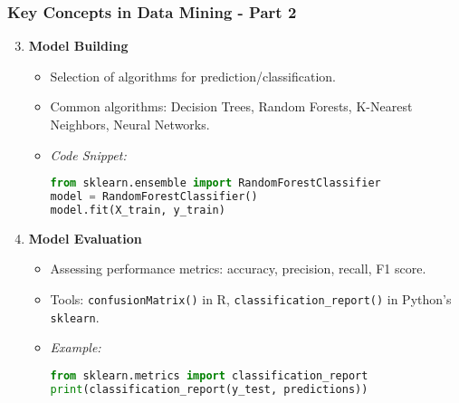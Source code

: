 \documentclass[aspectratio=169]{beamer}
\begin{document}
\begin{frame}[fragile]
    \frametitle{Key Concepts in Data Mining - Part 2}
    \begin{enumerate}
        \setcounter{enumi}{2} %
        
        \item \textbf{Model Building}
        \begin{itemize}
            \item Selection of algorithms for prediction/classification.
            \item Common algorithms: Decision Trees, Random Forests, K-Nearest Neighbors, Neural Networks.
            \item \textit{Code Snippet:} 
            \begin{lstlisting}[language=python]
from sklearn.ensemble import RandomForestClassifier
model = RandomForestClassifier()
model.fit(X_train, y_train)
            \end{lstlisting}
        \end{itemize}
        
        \item \textbf{Model Evaluation}
        \begin{itemize}
            \item Assessing performance metrics: accuracy, precision, recall, F1 score.
            \item Tools: \texttt{confusionMatrix()} in R, \texttt{classification\_report()} in Python's \texttt{sklearn}.
            \item \textit{Example:} 
            \begin{lstlisting}[language=python]
from sklearn.metrics import classification_report
print(classification_report(y_test, predictions))
            \end{lstlisting}
        \end{itemize}
    \end{enumerate}
\end{frame}
\end{document}

